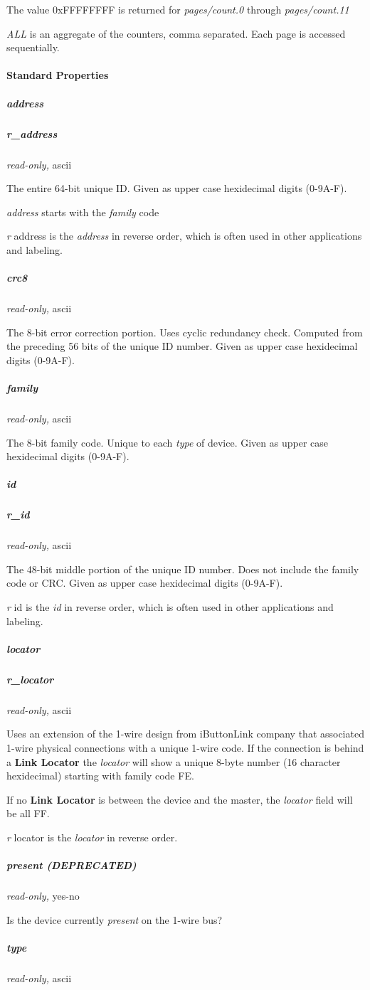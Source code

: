 The value 0xFFFFFFFF is returned for \textit{pages/count.0} through \textit{pages/count.11}


\textit{ALL} is an aggregate of the counters, comma separated. Each page is accessed
sequentially. 
\paragraph*{Standard Properties}
          
\subparagraph*{address}
\subparagraph*{r\_address}\textit{read-only,} ascii


The entire 64-bit unique ID. Given as upper case hexidecimal digits (0-9A-F).


\textit{address} starts with the \textit{family} code 

\textit{r} address is the \textit{address} in reverse order, which is often used in other
applications and labeling. 
\subparagraph*{crc8}\textit{read-only,} ascii 

The 8-bit error correction portion. Uses cyclic redundancy check. Computed
from the preceding 56 bits of the unique ID number. Given as upper case
hexidecimal digits (0-9A-F). 
\subparagraph*{family}\textit{read-only,} ascii 

The 8-bit family code. Unique to each \textit{type} of device. Given as upper case
hexidecimal digits (0-9A-F). 
\subparagraph*{id}
\subparagraph*{r\_id}\textit{read-only,} ascii 

The 48-bit middle portion of the unique ID number. Does not include the family
code or CRC. Given as upper case hexidecimal digits (0-9A-F). 

\textit{r} id is the \textit{id} in reverse order, which is often used in other applications
and labeling. 
\subparagraph*{locator}
\subparagraph*{r\_locator}\textit{read-only,} ascii 

Uses an extension of the 1-wire design from iButtonLink company that associated
1-wire physical connections with a unique 1-wire code. If the connection is
behind a \textbf{Link Locator} the \textit{locator} will show a unique 8-byte number (16 character
hexidecimal) starting with family code FE. 

If no \textbf{Link Locator} is between the device and the master, the \textit{locator} field
will be all FF. 

\textit{r} locator is the \textit{locator} in reverse order. 
\subparagraph*{present (DEPRECATED)}\textit{read-only,}
yes-no 

Is the device currently \textit{present} on the 1-wire bus? 
\subparagraph*{type}\textit{read-only,} ascii 

